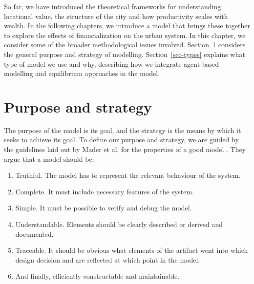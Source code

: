 So far, we have introduced the theoretical frameworks for understanding locational value, the structure of the city and how productivity scales with wealth. In the following chapters, we introduce a model that brings these together to explore the effects of financialization on the urban system. In this chapter, we consider some of the broader methodological issues involved. Section~\ref{sec-purpose} considers the general purpose and strategy of modelling. %
Section~\ref{sec-types} explains what type of model we use and why,  describing how we integrate agent-based modelling and equilibrium approaches in the model.   %

\section{Purpose and strategy}\label{sec-purpose}

The purpose of the model is its goal, and the strategy is the means by which it seeks to achieve its goal. To define our purpose and strategy, we are guided by the guidelines laid out by Mader et al. for the properties of a good model \cite{maderConstructionVerificationModels2007}. %
They argue that a model should be: 
\begin{enumerate}   
\item  Truthful. The model has to represent the relevant behaviour of the system. %
\item  Complete. It must include necessary features of the system.
\item Simple. It must be possible to verify and debug the model.
\item Understandable. Elements should be clearly described or derived and documented.
\item  Traceable.  It should be obvious what elements of the artifact went into which design decision and are reflected at which point in the model.
\item  And finally, efficiently constructable and maintainable.
\end{enumerate}

